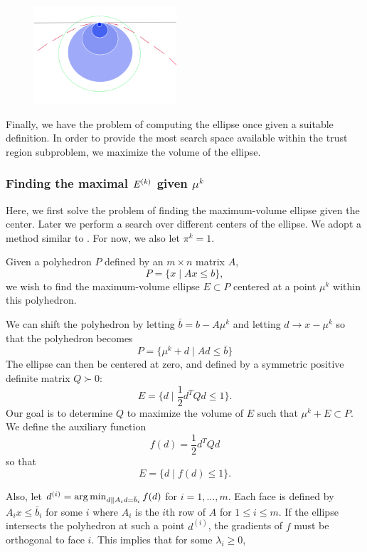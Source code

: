 \begin{figure}[h]
    \centering
    \includegraphics[width=200px]{images/second_order_critical_point.png}
    \label{fbns}
\end{figure}



Finally, we have the problem of computing the ellipse once given a suitable definition.
In order to provide the most search space available within the trust region subproblem, we maximize the volume of the ellipse.

\subsubsection{Finding the maximal $ {E^{(k)}} $ given $\mu^k$}

\label{ellipse_optimization}

Here, we first solve the problem of finding the maximum-volume ellipse given the center.
Later we perform a search over different centers of the ellipse.
We adopt a method similar to \cite{Khachiyan1993}.
For now, we also let $\pi^k = 1$.

Given a polyhedron $P$ defined by an $m \times n$ matrix $A$,
\[
P = \{ x \; | \;  Ax \le b \},
\]
we wish to find the maximum-volume ellipse $E \subset P$ centered at a point $\mu^{k}$ within this polyhedron.

We can shift the polyhedron by letting $\bar{b} = b - A\mu^{k}$ and letting $d \to x - \mu^{k}$ so that the polyhedron becomes
\[
P = \{ \mu^k + d \; | \;  Ad \le \bar{b} \}
\]
The ellipse can then be centered at zero, and defined by a symmetric positive definite matrix $Q \succ 0$:
\[
E = \{ d \; | \; \frac 1 2 d^T Q d \le 1 \}.
\]
Our goal is to determine $Q$ to maximize the volume of $E$ such that $\mu^{k} + E \subset P$.
We define the auxiliary function 
\[
f(d) = \frac 1 2 d^T Q d
\]
so that 
\[
E = \{ d \; | \; f(d) \le 1 \}.
\]

Also, let $d^{(i)} = \operatorname*{arg\,min}_{d\| A_id =\bar{b}_i} f(d)$ for $i=1,\ldots,m$.
Each face is defined by $A_i x \le \bar{b}_i$ for some $i$ where $A_i$ is the $i$th row of $A$ for $1\le i \le m$.
If the ellipse intersects the polyhedron at such a point $d^{(i)}$, the gradients of $f$ must be orthogonal to face $i$.
This implies that for some $\lambda_i \ge 0$,

